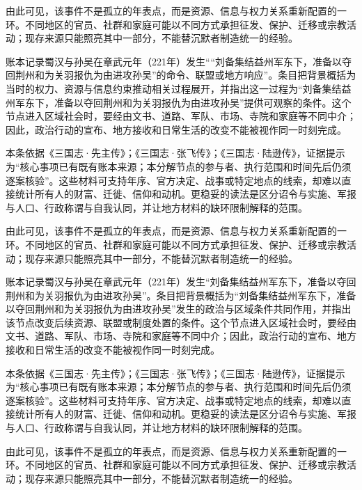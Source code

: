 由此可见，该事件不是孤立的年表点，而是资源、信息与权力关系重新配置的一环。不同地区的官员、社群和家庭可能以不同方式承担征发、保护、迁移或宗教活动；现存来源只能照亮其中一部分，不能替沉默者制造统一的经验。

账本记录蜀汉与孙吴在章武元年（221年）发生““刘备集结益州军东下，准备以夺回荆州和为关羽报仇为由进攻孙吴”的命令、联盟或地方响应”。条目把背景概括为当时的权力、资源与信息约束推动相关过程展开，并指出这一过程为“刘备集结益州军东下，准备以夺回荆州和为关羽报仇为由进攻孙吴”提供可观察的条件。这个节点进入区域社会时，要经由文书、道路、军队、市场、寺院和家庭等不同中介；因此，政治行动的宣布、地方接收和日常生活的改变不能被视作同一时刻完成。

本条依据《三国志·先主传》；《三国志·张飞传》；《三国志·陆逊传》，证据提示为“核心事项已有既有账本来源；本分解节点的参与者、执行范围和时间先后仍须逐案核验”。这些材料可支持年序、官方决定、战事或特定地点的线索，却难以直接统计所有人的财富、迁徙、信仰和动机。更稳妥的读法是区分诏令与实施、军报与人口、行政称谓与自我认同，并让地方材料的缺环限制解释的范围。

由此可见，该事件不是孤立的年表点，而是资源、信息与权力关系重新配置的一环。不同地区的官员、社群和家庭可能以不同方式承担征发、保护、迁移或宗教活动；现存来源只能照亮其中一部分，不能替沉默者制造统一的经验。

账本记录蜀汉与孙吴在章武元年（221年）发生“刘备集结益州军东下，准备以夺回荆州和为关羽报仇为由进攻孙吴”。条目把背景概括为“刘备集结益州军东下，准备以夺回荆州和为关羽报仇为由进攻孙吴”发生的政治与区域条件共同作用，并指出该节点改变后续资源、联盟或制度处置的条件。这个节点进入区域社会时，要经由文书、道路、军队、市场、寺院和家庭等不同中介；因此，政治行动的宣布、地方接收和日常生活的改变不能被视作同一时刻完成。

本条依据《三国志·先主传》；《三国志·张飞传》；《三国志·陆逊传》，证据提示为“核心事项已有既有账本来源；本分解节点的参与者、执行范围和时间先后仍须逐案核验”。这些材料可支持年序、官方决定、战事或特定地点的线索，却难以直接统计所有人的财富、迁徙、信仰和动机。更稳妥的读法是区分诏令与实施、军报与人口、行政称谓与自我认同，并让地方材料的缺环限制解释的范围。

由此可见，该事件不是孤立的年表点，而是资源、信息与权力关系重新配置的一环。不同地区的官员、社群和家庭可能以不同方式承担征发、保护、迁移或宗教活动；现存来源只能照亮其中一部分，不能替沉默者制造统一的经验。

